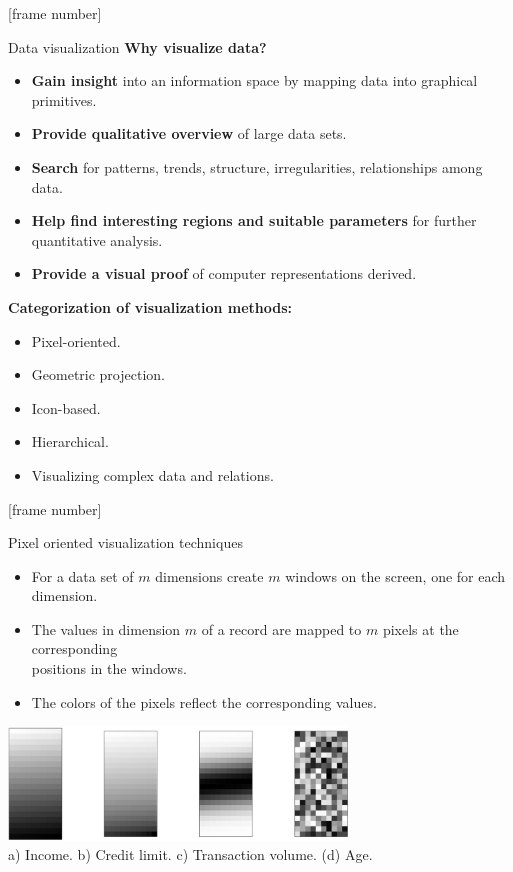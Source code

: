 \documentclass[aspectratio=169,t]{beamer}
\begin{document}
  {
    [frame number]
    \begin{frame}{Data visualization}
    \textbf{Why visualize data?}
    \begin{itemize}
      \item \textbf{Gain insight} into an information space by mapping data into graphical primitives.
      \item \textbf{Provide qualitative overview} of large data sets.
      \item \textbf{Search} for patterns, trends, structure, irregularities, relationships among data.
      \item \textbf{Help find interesting regions and suitable parameters} for further quantitative analysis.
      \item \textbf{Provide a visual proof} of computer representations derived.
    \end{itemize}
    \textbf{Categorization of visualization methods:}
    \begin{itemize}
      \item Pixel-oriented.
      \item Geometric projection.
      \item Icon-based.
      \item Hierarchical.
      \item Visualizing complex data and relations.
    \end{itemize}
    \end{frame}
  }

  {
    [frame number]
    \begin{frame}{Pixel oriented visualization techniques}
    \begin{itemize}
      \item For a data set of $m$ dimensions create $m$ windows on the screen, one for each dimension.
      \item The values in dimension $m$ of a record are mapped to $m$ pixels at the corresponding \\ positions in the windows.
      \item The colors of the pixels reflect the corresponding values.
    \end{itemize}
    \vspace{0.5cm}
    \centering
    \includegraphics[width=9cm]{img/pixel.jpg}\\
    a) Income. \hspace{0.3cm} b) Credit limit. \hspace{0.2cm} c) Transaction volume. \hspace{0.2cm} (d) Age.
    \end{frame}
  }
\end{document}

